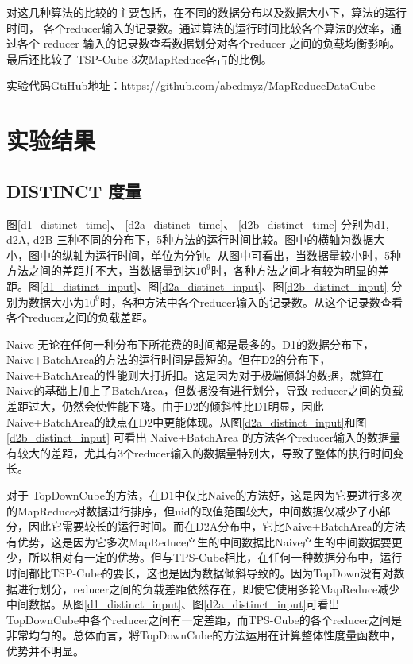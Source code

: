 对这几种算法的比较的主要包括，在不同的数据分布以及数据大小下，算法的运行时间， 各个reducer输入的记录数。通过算法的运行时间比较各个算法的效率，通过各个 reducer 输入的记录数查看数据划分对各个reducer 之间的负载均衡影响。最后还比较了 TSP-Cube 3次MapReduce各占的比例。

实验代码GtiHub地址：\url{https://github.com/abcdmyz/MapReduceDataCube}

\section{实验结果}

\subsection{DISTINCT 度量}


图\ref{d1_distinct_time}、 \ref{d2a_distinct_time}、 \ref{d2b_distinct_time} 分别为d1, d2A, d2B 三种不同的分布下，5种方法的运行时间比较。图中的横轴为数据大小，图中的纵轴为运行时间，单位为分钟。从图中可看出，当数据量较小时，5种方法之间的差距并不大，当数据量到达${10}^{9}$时，各种方法之间才有较为明显的差距。图\ref{d1_distinct_input}、图\ref{d2a_distinct_input}、图\ref{d2b_distinct_input} 分别为数据大小为${10}^{9}$时，各种方法中各个reducer输入的记录数。从这个记录数查看各个reducer之间的负载差距。

Naive 无论在任何一种分布下所花费的时间都是最多的。D1的数据分布下，Naive+BatchArea的方法的运行时间是最短的。但在D2的分布下，Naive+BatchArea的性能则大打折扣。这是因为对于极端倾斜的数据，就算在Naive的基础上加上了BatchArea，但数据没有进行划分，导致 reducer之间的负载差距过大，仍然会使性能下降。由于D2的倾斜性比D1明显，因此Naive+BatchArea的缺点在D2中更能体现。从图\ref{d2a_distinct_input}和图\ref{d2b_distinct_input} 可看出 Naive+BatchArea 的方法各个reducer输入的数据量有较大的差距，尤其有3个reducer输入的数据量特别大，导致了整体的执行时间变长。

对于 TopDownCube的方法，在D1中仅比Naive的方法好，这是因为它要进行多次的MapReduce对数据进行排序，但uid的取值范围较大，中间数据仅减少了小部分，因此它需要较长的运行时间。而在D2A分布中，它比Naive+BatchArea的方法有优势，这是因为它多次MapReduce产生的中间数据比Naive产生的中间数据要更少，所以相对有一定的优势。但与TPS-Cube相比，在任何一种数据分布中，运行时间都比TSP-Cube的要长，这也是因为数据倾斜导致的。因为TopDown没有对数据进行划分，reducer之间的负载差距依然存在，即使它使用多轮MapReduce减少中间数据。从图\ref{d1_distinct_input}、图\ref{d2a_distinct_input}可看出TopDownCube中各个reducer之间有一定差距，而TPS-Cube的各个reducer之间是非常均匀的。总体而言，将TopDownCube的方法运用在计算整体性度量函数中，优势并不明显。


